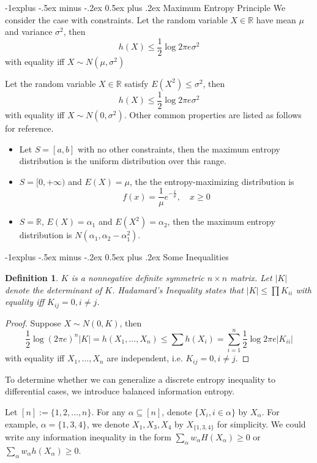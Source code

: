 \documentclass[10pt,landscape, a4paper]{article}
\makeatletter
\newtheorem{definition}{Definition}
\renewcommand{\subsection}{\@startsection{subsection}{2}{0mm}%
                                {-1explus -.5ex minus -.2ex}%
                                {0.5ex plus .2ex}%
                                {\normalfont\normalsize\bfseries}}
\makeatother
\begin{document}
\begin{multicols}{3}
\subsection{Maximum Entropy Principle}
We consider the case with constraints. Let the random variable $X\in \mathbb{R}$ have mean $\mu$ and variance $\sigma^2$, then
$$
h(X)\le \frac{1}{2}\log 2\pi e\sigma^2
$$
with equality iff $X\sim N(\mu, \sigma^2)$

Let the random variable $X\in \mathbb{R}$ satisfy $E(X^2)\le \sigma^2$, then
$$
h(X)\le \frac{1}{2}\log 2\pi e\sigma^2
$$
with equality iff $X\sim N(0, \sigma^2)$. Other common properties are listed as follows for reference.
\begin{itemize}
    \item Let $S=[a,b]$ with no other constraints, then the maximum entropy distribution is the uniform distribution over this range.

    \item  $S=[0,+\infty)$ and $E(X)=\mu$, the the entropy-maximizing distribution is
      $$
      f(x)=\frac{1}{\mu}e^{-\frac{x}{\mu}}, \quad x\ge 0
      $$
    
    \item $S=\mathbb{R}$, $E(X)=\alpha_1$ and $E(X^2)=\alpha_2$, then the maximum entropy distribution is $N(\alpha_1,\alpha_2-\alpha_1^2)$.
\end{itemize}

\subsection{Some Inequalities}
  \begin{definition}
    $K$ is a nonnegative definite symmetric $n\times n$ matrix. Let $|K|$ denote the determinant of $K$. Hadamard's Inequality states that $|K|\le \prod K_{ii}$ with equality iff $K_{ij}=0, i\ne j$.
  \end{definition}
  \begin{proof}
    Suppose $X\sim N(0,K)$, then
    $$
    \frac{1}{2}\log (2\pi e)^n|K|=h(X_1,\dots, X_n)\le \sum h(X_i)=\sum_{i=1}^n \frac{1}{2}\log 2\pi e|K_{ii}|
    $$
    with equality iff $X_1,\dots, X_n$ are independent, i.e. $K_{ij}=0, i\ne j$.
  \end{proof}

  To determine whether we can generalize a discrete entropy inequality to differential cases, we introduce balanced information entropy.

  Let $[n]:=\{1,2,\dots, n\}$. For any $\alpha\subseteq [n]$, denote $\{X_i, i\in \alpha\}$ by $X_\alpha$. For example, $\alpha=\{1,3,4\}$, we denote $X_1,X_3,X_4$ by $X_{\{1,3,4\}}$ for simplicity. We could write any information inequality in the form $\sum_\alpha w_\alpha H(X_\alpha)\ge 0$ or $\sum_\alpha w_\alpha h(X_\alpha)\ge 0$. 
  

\end{multicols}
\end{document}
